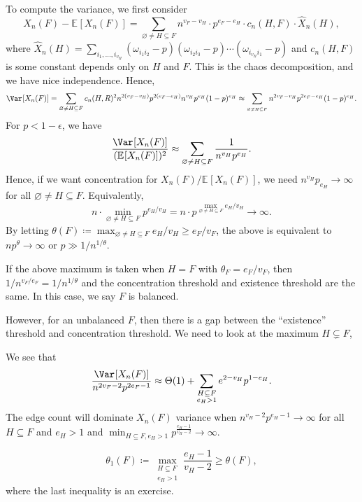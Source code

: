 To compute the variance, we first consider
\[
	X_n(F) - \mathbb{E}_{}[X_n(F)]
	= \sum_{\varnothing \neq H \subseteq F} n^{v_F - v_H} \cdot p^{e_F - e_H} \cdot c_n(H, F) \cdot \hat{X} _n(H),
\]
where \(\hat{X} _n(H) = \sum_{i_1, \dots , i_{v_H}}  (\omega _{i_1 i_2} - p) (\omega _{i_2 i_3} - p) \cdots (\omega _{i_{v_H} i_1} - p)\) and \(c_n(H, F)\) is some constant depends only on \(H\) and \(F\). This is the chaos decomposition, and we have nice independence. Hence,
\[
	\Var_{}[X_n(F)]
	= \sum_{\varnothing \neq H \subseteq F} c_n(H, R)^2 n^{2 (v_F - v_H)} p^{2(e_F - e_H)} n^{v_H} p^{e_H} (1 - p)^{e_H}
	\approx \sum_{_{\varnothing \neq H \subseteq F}} n^{2 v_F - v_H} p^{2 e_F - e_H} (1 - p)^{e_H}.
\]
For \(p < 1 - \epsilon \), we have
\[
	\frac{\Var_{}[X_n(F)] }{(\mathbb{E}_{}[X_n(F)] )^2}
	\approx \sum_{\varnothing \neq H \subseteq F} \frac{1}{n^{v_H} p^{e_H}}.
\]
Hence, if we want concentration for \(X_n(F) / \mathbb{E}_{}[X_n(F)] \), we need \(n^{v_H} p_{e_H} \to \infty\) for all \(\varnothing \neq H \subseteq F\). Equivalently,
\[
	n \cdot \min _{\varnothing \neq H \subseteq F} p^{e_H / v_H}
	= n \cdot p^{\max _{\varnothing \neq H \subseteq F} e_H / v_H}
	\to \infty.
\]
By letting \(\theta (F) \coloneqq \max _{\varnothing \neq H \subseteq F} e_H / v_H \geq e_F / v_F\), the above is equivalent to \(n p^\theta \to \infty \) or \(p \gg 1 / n^{1 / \theta }\).

\begin{remark}
	If the above maximum is taken when \(H = F\) with \(\theta _F = e_F / v_F\), then \(1 / n^{v_F / e_F} = 1 / n^{1 / \theta }\) and the concentration threshold and existence threshold are the same. In this case, we say \(F\) is balanced.

	However, for an unbalanced \(F\), then there is a gap between the ``existence'' threshold and concentration threshold. We need to look at the maximum \(H \subsetneq F\),
\end{remark}

We see that
\[
	\frac{\Var_{}[X_n(F)] }{n^{2v_F - 2} p^{2e_F - 1}}
	\approx \Theta (1) + \sum_{\substack{H \subseteq F \\ e_H > 1}} e^{2 - v_H} p^{1 - e_H}.
\]
The edge count will dominate \(X_n(F)\) variance when \(n^{v_H - 2} p^{e_H - 1} \to \infty \) for all \(H \subseteq F\) and \(e_H > 1\) and \(\min _{H \subseteq F, e_H > 1} p^{\frac{e_H - 1}{v_H - 2}} \to \infty \).

\[
	\theta _1(F)
	\coloneqq \max _{\substack{H \subseteq F \\ e_H > 1}} \frac{e_H - 1}{v_H - 2}
	\geq \theta (F),
\]
where the last inequality is an exercise.


